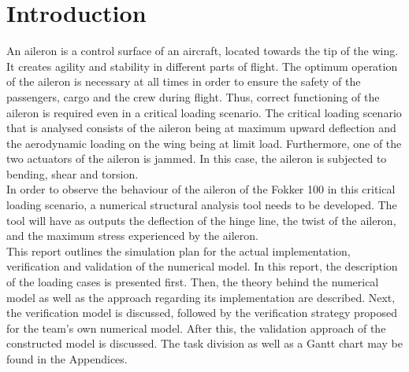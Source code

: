 \section{Introduction}
\label{Introduction}


An aileron is a control surface of an aircraft, located towards the tip of the wing. It creates agility and stability in different parts of flight. The optimum operation of the aileron is necessary at all times in order to ensure the safety of the passengers, cargo and the crew during flight. Thus, correct functioning of the aileron is required even in a critical loading scenario. The critical loading scenario that is analysed consists of the aileron being at maximum upward deflection and the aerodynamic loading on the
wing being at limit load. Furthermore, one of the two actuators of the aileron is jammed. In this case, the aileron is subjected to bending, shear and torsion. \\

\noindent In order to observe the behaviour of the aileron of the Fokker 100 in this critical loading scenario, a numerical structural analysis tool needs to be developed. The tool will have as outputs the deflection of the hinge line, the twist of the aileron, and the maximum stress experienced by the aileron.\\

\noindent This report outlines the simulation plan for the actual implementation, verification and validation of the numerical model. In this report, the description of the loading cases is presented first. Then, the theory behind the numerical model as well as the approach regarding its implementation are described. Next, the verification model is discussed, followed by the verification strategy proposed for the team's own numerical model. After this, the validation approach of the constructed model is discussed. The task division as well as a Gantt chart may be found in the Appendices.   
